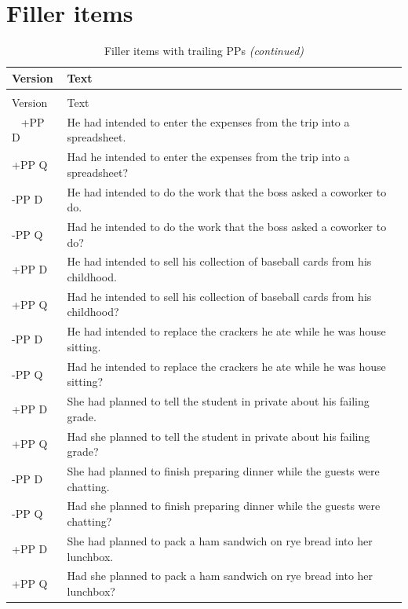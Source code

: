 \documentclass[12pt,oneside]{book}
\begin{document}
\newpage

\hypertarget{appFill}{%
\chapter{Filler items}\label{appFill}}

\begin{longtable}{ll}
\caption{\label{tab:unnamed-chunk-2}Filler items with trailing PPs}\\
\toprule
Version & Text\\
\midrule
\endfirsthead
\caption[]{\label{tab:unnamed-chunk-2}Filler items with trailing PPs \textit{(continued)}}\\
\toprule
Version & Text\\
\midrule
\endhead
\
\endfoot
\bottomrule
\endlastfoot
+PP D & He had intended to enter the expenses from the trip into a spreadsheet.\\
+PP Q & Had he intended to enter the expenses from the trip into a spreadsheet?\\
\addlinespace
-PP D & He had intended to do the work that the boss asked a coworker to do.\\
-PP Q & Had he intended to do the work that the boss asked a coworker to do?\\
\addlinespace
+PP D & He had intended to sell his collection of baseball cards from his childhood.\\
+PP Q & Had he intended to sell his collection of baseball cards from his childhood?\\
\addlinespace
-PP D & He had intended to replace the crackers he ate while he was house sitting.\\
-PP Q & Had he intended to replace the crackers he ate while he was house sitting?\\
\addlinespace
+PP D & She had planned to tell the student in private about his failing grade.\\
+PP Q & Had she planned to tell the student in private about his failing grade?\\
\addlinespace
-PP D & She had planned to finish preparing dinner while the guests were chatting.\\
-PP Q & Had she planned to finish preparing dinner while the guests were chatting?\\
\addlinespace
+PP D & She had planned to pack a ham sandwich on rye bread into her lunchbox.\\
+PP Q & Had she planned to pack a ham sandwich on rye bread into her lunchbox?\\

\end{longtable}
\end{document}
